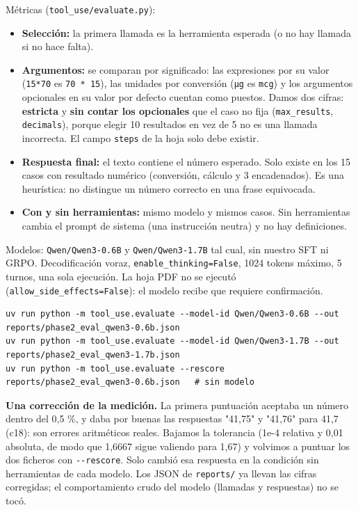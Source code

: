 Métricas (\texttt{tool\_\allowbreak{}use/\allowbreak{}evaluate.py}):

\begin{itemize}
\tightlist
\item
  \textbf{Selección:} la primera llamada es la herramienta esperada (o no hay llamada si no hace falta).
\item
  \textbf{Argumentos:} se comparan por significado: las expresiones por su valor (\texttt{15*70} es \texttt{70 * 15}),
  las unidades por conversión (\texttt{µg} es \texttt{mcg}) y los argumentos opcionales en su valor por defecto
  cuentan como puestos. Damos dos cifras: \textbf{estricta} y \textbf{sin contar los opcionales} que el caso
  no fija (\texttt{max\_\allowbreak{}results}, \texttt{decimals}), porque elegir 10 resultados en vez de 5 no es una llamada
  incorrecta. El campo \texttt{steps} de la hoja solo debe existir.
\item
  \textbf{Respuesta final:} el texto contiene el número esperado. Solo existe en los 15 casos con
  resultado numérico (conversión, cálculo y 3 encadenados). Es una heurística: no distingue un
  número correcto en una frase equivocada.
\item
  \textbf{Con y sin herramientas:} mismo modelo y mismos casos. Sin herramientas cambia el prompt de
  sistema (una instrucción neutra) y no hay definiciones.
\end{itemize}

Modelos: \texttt{Qwen/\allowbreak{}Qwen3-0.6B} y \texttt{Qwen/\allowbreak{}Qwen3-1.7B} tal cual, sin nuestro SFT ni GRPO. Decodificación
voraz, \texttt{enable\_\allowbreak{}thinking=\allowbreak{}False}, 1024 tokens máximo, 5 turnos, una sola ejecución. La hoja PDF no
se ejecutó (\texttt{allow\_\allowbreak{}side\_\allowbreak{}effects=\allowbreak{}False}): el modelo recibe que requiere confirmación.

\begin{lstlisting}
uv run python -m tool_use.evaluate --model-id Qwen/Qwen3-0.6B --out reports/phase2_eval_qwen3-0.6b.json
uv run python -m tool_use.evaluate --model-id Qwen/Qwen3-1.7B --out reports/phase2_eval_qwen3-1.7b.json
uv run python -m tool_use.evaluate --rescore reports/phase2_eval_qwen3-0.6b.json   # sin modelo
\end{lstlisting}

\textbf{Una corrección de la medición.} La primera puntuación aceptaba un número dentro del 0,5 \%, y
daba por buenas las respuestas "41,75" y "41,76" para 41,7 (c18): son errores aritméticos reales.
Bajamos la tolerancia (1e-4 relativa y 0,01 absoluta, de modo que 1,6667 sigue valiendo para 1,67) y
volvimos a puntuar los dos ficheros con \texttt{-\/\allowbreak{}-rescore}. Solo cambió esa respuesta en la condición sin
herramientas de cada modelo. Los JSON de \texttt{reports/\allowbreak{}} ya llevan las cifras corregidas; el
comportamiento crudo del modelo (llamadas y respuestas) no se tocó.


